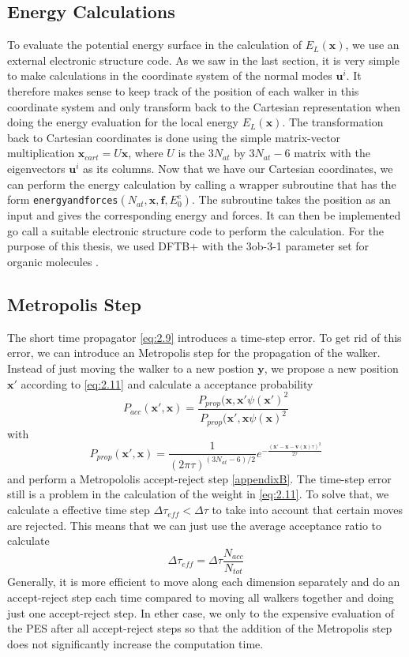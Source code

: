 \documentclass [12pt]{report}
\begin{document}
\subsection{Energy Calculations}
To evaluate the potential energy surface in the calculation of $E_L(\bm{x})$, we use an external electronic structure code. As we saw in the last section, it is very simple to make calculations in the coordinate system of the normal modes $\bm{u}^i$. It therefore makes sense to keep track of the position of each walker in this coordinate system and only transform back to the Cartesian representation when doing the energy evaluation for the local energy $E_L(\bm{x})$. The transformation back to Cartesian coordinates is done using the simple matrix-vector multiplication $\bm{x}_{cart} = U\bm{x}$, where $U$ is the $3N_{at}$ by $3N_{at} - 6$ matrix with the eigenvectors $\bm{u}^i$ as its columns. Now that we have our Cartesian coordinates, we can perform the energy calculation by calling a wrapper subroutine that has the form \verb|energyandforces|$(N_{at},\bm{x},\bm{f},E^e_0)$. The subroutine takes the position as an input and gives the corresponding energy and forces. It can then be implemented go call a suitable electronic structure code to perform the calculation. For the purpose of this thesis, we used DFTB+ \cite{dftbp} with the 3ob-3-1 parameter set for organic molecules \cite{3ob-3-1}.
\subsection{Metropolis Step}
The short time propagator \eqref{eq:2.9} introduces a time-step error. To get rid of this error, we can introduce an Metropolis step for the propagation of the walker. Instead of just moving the walker to a new postion $\bm{y}$, we propose a new position $\bm{x}'$ according to \eqref{eq:2.11} and calculate a acceptance probability 
\begin{equation}\label{Pacc}
P_{acc}(\bm{x}',\bm{x}) = \frac{P_{prop}(\bm{x},\bm{x}' \psi(\bm{x}')^2}{P_{prop}(\bm{x}',\bm{x} \psi(\bm{x})^2}
\end{equation}
with
\begin{equation}\label{Pprop}
P_{prop}(\bm{x}',\bm{x}) = \frac{1}{(2\pi\tau)^{(3N_{at}-6)/2}} e^{-\frac{(\bm{x}'-\bm{x}-\bm{v}(\bm{x})\tau)^2}{2\tau}}
\end{equation}
and perform a Metropololis accept-reject step \ref{appendixB}.
The time-step error still is a problem in the calculation of the weight in \eqref{eq:2.11}. To solve that, we calculate a effective time step $\Delta \tau_{eff} < \Delta \tau$ to take into account that certain moves are rejected. This means that we can just use the average acceptance ratio to calculate
\begin{equation}\label{tau_eff}
\Delta \tau_{eff} = \Delta \tau \frac{N_{acc}}{N_{tot}}
\end{equation}
Generally, it is more efficient to move along each dimension separately and do an accept-reject step each time compared to moving all walkers together and doing just one accept-reject step. In ether case, we only to the expensive evaluation of the PES after all accept-reject steps so that the addition of the Metropolis step does not significantly increase the computation time.
\end{document}
